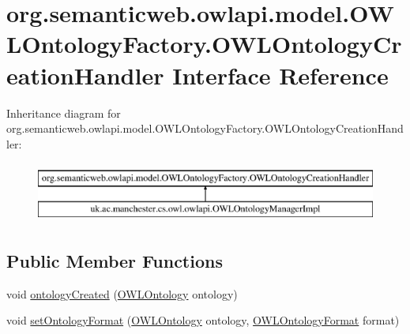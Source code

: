 \hypertarget{interfaceorg_1_1semanticweb_1_1owlapi_1_1model_1_1_o_w_l_ontology_factory_1_1_o_w_l_ontology_creation_handler}{\section{org.\-semanticweb.\-owlapi.\-model.\-O\-W\-L\-Ontology\-Factory.\-O\-W\-L\-Ontology\-Creation\-Handler Interface Reference}
\label{interfaceorg_1_1semanticweb_1_1owlapi_1_1model_1_1_o_w_l_ontology_factory_1_1_o_w_l_ontology_creation_handler}
}
Inheritance diagram for org.\-semanticweb.\-owlapi.\-model.\-O\-W\-L\-Ontology\-Factory.\-O\-W\-L\-Ontology\-Creation\-Handler\-:\begin{figure}[H]
\begin{center}
\leavevmode
\includegraphics[height=2.000000cm]{interfaceorg_1_1semanticweb_1_1owlapi_1_1model_1_1_o_w_l_ontology_factory_1_1_o_w_l_ontology_creation_handler}
\end{center}
\end{figure}
\subsection*{Public Member Functions}
\begin{DoxyCompactItemize}
\item 
void \hyperlink{interfaceorg_1_1semanticweb_1_1owlapi_1_1model_1_1_o_w_l_ontology_factory_1_1_o_w_l_ontology_creation_handler_a8df743cae0f4bef03e9421afe9944215}{ontology\-Created} (\hyperlink{interfaceorg_1_1semanticweb_1_1owlapi_1_1model_1_1_o_w_l_ontology}{O\-W\-L\-Ontology} ontology)
\item 
void \hyperlink{interfaceorg_1_1semanticweb_1_1owlapi_1_1model_1_1_o_w_l_ontology_factory_1_1_o_w_l_ontology_creation_handler_ad851e177ae70b8786e69adbec9a8214a}{set\-Ontology\-Format} (\hyperlink{interfaceorg_1_1semanticweb_1_1owlapi_1_1model_1_1_o_w_l_ontology}{O\-W\-L\-Ontology} ontology, \hyperlink{classorg_1_1semanticweb_1_1owlapi_1_1model_1_1_o_w_l_ontology_format}{O\-W\-L\-Ontology\-Format} format)
\end{DoxyCompactItemize}


